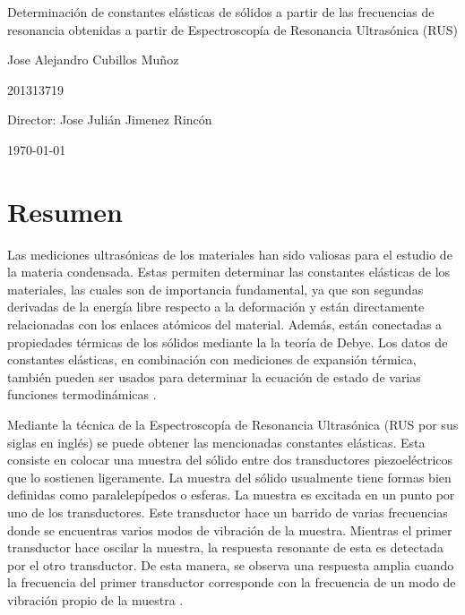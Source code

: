 \documentclass[12pt]{article}
\begin{document}
\begin{center}
\Huge
Determinación de constantes elásticas de sólidos a partir de las frecuencias de resonancia obtenidas a partir de Espectroscopía de Resonancia Ultrasónica (RUS)

\vspace{3mm}
\Large Jose Alejandro Cubillos Muñoz

\large
201313719


\vspace{2mm}
\Large
Director: Jose Julián Jimenez Rincón

\normalsize
\vspace{2mm}

\today
\end{center}


\normalsize

\section{Resumen}

Las mediciones ultrasónicas de los materiales han sido valiosas para el estudio de la materia condensada. Estas permiten determinar las constantes elásticas de los materiales, las cuales son de importancia fundamental, ya que son segundas derivadas de la energía libre respecto a la deformación y están directamente relacionadas con los enlaces atómicos del material. Además, están conectadas a propiedades térmicas de los sólidos mediante la la teoría de Debye. Los datos de constantes elásticas, en combinación con mediciones de expansión térmica, también pueden ser usados para determinar la ecuación de estado de varias funciones termodinámicas \cite{Leisure_1997}.


Mediante la técnica de la Espectroscopía de Resonancia Ultrasónica (RUS por sus siglas en inglés) se puede obtener las mencionadas constantes elásticas. Esta consiste en colocar una muestra del sólido entre dos transductores piezoeléctricos que lo sostienen ligeramente. La muestra del sólido usualmente tiene formas bien definidas como paralelepípedos o esferas. La muestra es excitada en un punto por uno de los transductores. Este transductor hace un barrido de varias frecuencias donde se encuentras varios modos de vibración de la muestra. Mientras el primer transductor hace oscilar la muestra, la respuesta resonante de esta es detectada por el otro transductor. De esta manera, se observa una respuesta amplia cuando la frecuencia del primer transductor corresponde con la frecuencia de un modo de vibración propio de la muestra \cite{Leisure_1997}. 
\end{document}
